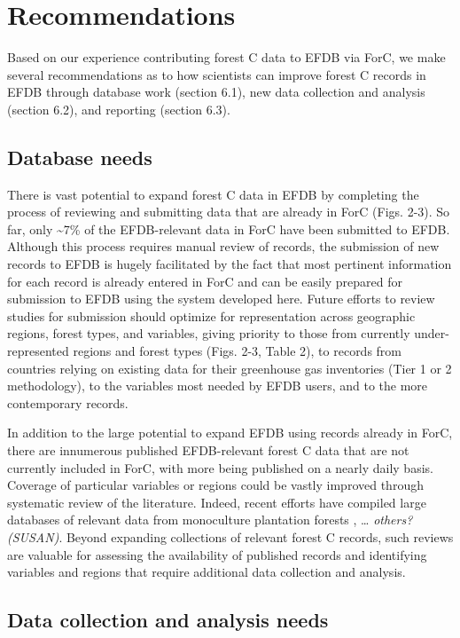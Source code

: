 \documentclass[, manuscript]{copernicus}
\begin{document}
\section{Recommendations}

Based on our experience contributing forest C data to EFDB via ForC, we
make several recommendations as to how scientists can improve forest C
records in EFDB through database work (section 6.1), new data collection
and analysis (section 6.2), and reporting (section 6.3).

\subsection{Database needs}

There is vast potential to expand forest C data in EFDB by completing
the process of reviewing and submitting data that are already in ForC
(Figs. 2-3). So far, only \textasciitilde7\% of the EFDB-relevant data
in ForC have been submitted to EFDB. Although this process requires
manual review of records, the submission of new records to EFDB is
hugely facilitated by the fact that most pertinent information for each
record is already entered in ForC and can be easily prepared for
submission to EFDB using the system developed here. Future efforts to
review studies for submission should optimize for representation across
geographic regions, forest types, and variables, giving priority to
those from currently under-represented regions and forest types (Figs.
2-3, Table 2), to records from countries relying on existing data for
their greenhouse gas inventories (Tier 1 or 2 methodology), to the
variables most needed by EFDB users, and to the more contemporary
records.

In addition to the large potential to expand EFDB using records already
in ForC, there are innumerous published EFDB-relevant forest C data that
are not currently included in ForC, with more being published on a
nearly daily basis. Coverage of particular variables or regions could be
vastly improved through systematic review of the literature. Indeed,
recent efforts have compiled large databases of relevant data from
monoculture plantation forests \citep{bukoski_rates_2022}, \ldots{}
\emph{others? (SUSAN)}. Beyond expanding collections of relevant forest
C records, such reviews are valuable for assessing the availability of
published records and identifying variables and regions that require
additional data collection and analysis.

\subsection{Data collection and analysis needs}
\end{document}
